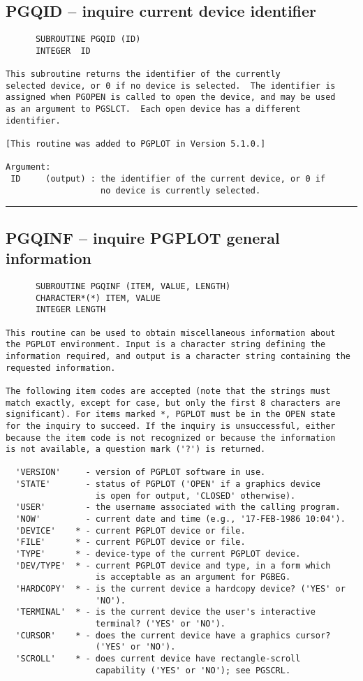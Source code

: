 {\subsection*{PGQID -- inquire current device identifier }
\begin{verbatim}
      SUBROUTINE PGQID (ID)
      INTEGER  ID

This subroutine returns the identifier of the currently
selected device, or 0 if no device is selected.  The identifier is
assigned when PGOPEN is called to open the device, and may be used
as an argument to PGSLCT.  Each open device has a different
identifier.

[This routine was added to PGPLOT in Version 5.1.0.]

Argument:
 ID     (output) : the identifier of the current device, or 0 if
                   no device is currently selected.
\end{verbatim}
\hrule


\subsection*{PGQINF -- inquire PGPLOT general information }
\begin{verbatim}
      SUBROUTINE PGQINF (ITEM, VALUE, LENGTH)
      CHARACTER*(*) ITEM, VALUE
      INTEGER LENGTH

This routine can be used to obtain miscellaneous information about
the PGPLOT environment. Input is a character string defining the
information required, and output is a character string containing the
requested information.

The following item codes are accepted (note that the strings must
match exactly, except for case, but only the first 8 characters are
significant). For items marked *, PGPLOT must be in the OPEN state
for the inquiry to succeed. If the inquiry is unsuccessful, either
because the item code is not recognized or because the information
is not available, a question mark ('?') is returned.

  'VERSION'     - version of PGPLOT software in use.
  'STATE'       - status of PGPLOT ('OPEN' if a graphics device
                  is open for output, 'CLOSED' otherwise).
  'USER'        - the username associated with the calling program.
  'NOW'         - current date and time (e.g., '17-FEB-1986 10:04').
  'DEVICE'    * - current PGPLOT device or file.
  'FILE'      * - current PGPLOT device or file.
  'TYPE'      * - device-type of the current PGPLOT device.
  'DEV/TYPE'  * - current PGPLOT device and type, in a form which
                  is acceptable as an argument for PGBEG.
  'HARDCOPY'  * - is the current device a hardcopy device? ('YES' or
                  'NO').
  'TERMINAL'  * - is the current device the user's interactive
                  terminal? ('YES' or 'NO').
  'CURSOR'    * - does the current device have a graphics cursor?
                  ('YES' or 'NO').
  'SCROLL'    * - does current device have rectangle-scroll
                  capability ('YES' or 'NO'); see PGSCRL.


\end{verbatim}}

